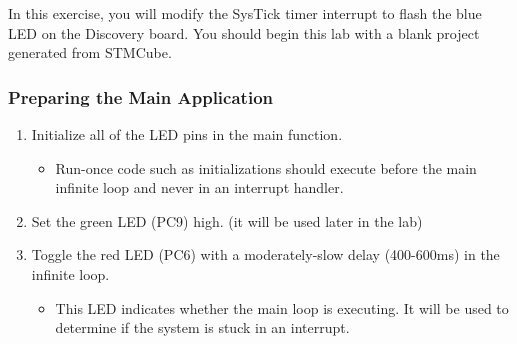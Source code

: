 \documentclass[11pt,fleqn]{book} %
\begin{document}
\begin{exercise}
    \label{ex1}
    In this exercise, you will modify the SysTick timer interrupt to flash the blue LED on the Discovery board. You should begin this lab with a blank project generated from STMCube.
    
   \subsubsection{Preparing the Main Application}
   \begin{enumerate}
       \item Initialize all of the LED pins in the main function.
       \begin{itemize}
           \item Run-once code such as initializations should execute before the main infinite loop and never in an interrupt handler.
       \end{itemize}
       \item Set the green LED (PC9) high. (it will be used later in the lab)
       \item Toggle the red LED (PC6) with a moderately-slow delay (400-600ms) in the infinite loop.
       \begin{itemize}
           \item This LED indicates whether the main loop is executing. It will be used to determine if the system is stuck in an interrupt.
       \end{itemize} 
   \end{enumerate}

\end{exercise}
\end{document}
